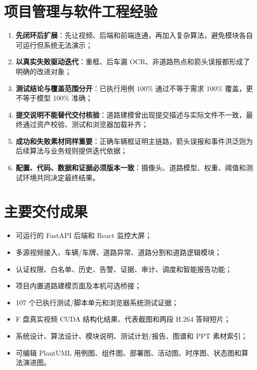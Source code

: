 \section{项目管理与软件工程经验}\label{summary-ux9879ux76eeux7ba1ux7406ux4e0eux8f6fux4ef6ux5de5ux7a0bux7ecfux9a8c}

\begin{enumerate}
\def\labelenumi{\arabic{enumi}.}
\tightlist
\item
  \textbf{先闭环后扩展}：先让视频、后端和前端连通，再加入复杂算法，避免模块各自可运行但系统无法演示；
\item
  \textbf{以真实失败驱动迭代}：重框、后车漏 OCR、非道路热点和箭头误报都形成了明确的改进对象；
\item
  \textbf{测试结论与覆盖范围分开}：已执行用例 100\% 通过不等于需求 100\% 覆盖，更不等于模型 100\% 准确；
\item
  \textbf{提交说明不能替代交付核验}：道路建模曾出现提交描述与实际文件不一致，最终通过资产校验、测试和浏览器加载补齐；
\item
  \textbf{成功和失败素材同样重要}：正确车辆框证明主链路，箭头误报和事件洪泛则为后续算法与业务规则提供迭代依据；
\item
  \textbf{配置、代码、数据和证据必须版本一致}：摄像头、道路模型、权重、阈值和测试环境共同决定最终结果。
\end{enumerate}

\section{主要交付成果}\label{summary-ux4e3bux8981ux4ea4ux4ed8ux6210ux679c}

\begin{itemize}
\tightlist
\item
  可运行的 FastAPI 后端和 React 监控大屏；
\item
  多源视频接入、车辆/车牌、道路异常、道路分割和道路逻辑模块；
\item
  认证权限、白名单、历史、告警、证据、审计、调度和智能报告功能；
\item
  项目内置道路建模页面及本机可选桥接；
\item
  107 个已执行测试/脚本单元和浏览器系统测试证据；
\item
  F 盘真实视频 CUDA 结构化结果、代表截图和两段 H.264 答辩短片；
\item
  系统设计、算法设计、模块说明、测试计划/报告、图谱和 PPT 素材索引；
\item
  可编辑 PlantUML 用例图、组件图、部署图、活动图、时序图、状态图和算法演进图。
\end{itemize}

